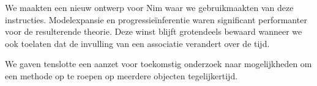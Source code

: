 We maakten een nieuw ontwerp voor Nim waar we gebruikmaakten van deze instructies. Modelexpansie en progressie\"inferentie waren significant performanter voor de resulterende theorie. Deze winst blijft grotendeels bewaard wanneer we ook toelaten dat de invulling van een associatie verandert over de tijd.

We gaven tenslotte een aanzet voor toekomstig onderzoek naar mogelijkheden om een methode op te roepen op meerdere objecten tegelijkertijd.